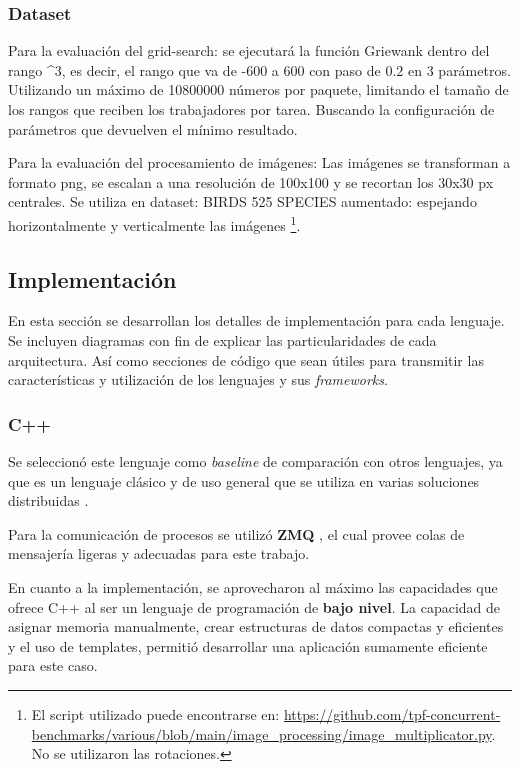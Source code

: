 \documentclass[11pt]{article}
\let\Oldsubsection\subsection
\renewcommand{\subsection}{\FloatBarrier\Oldsubsection}
\let\Oldsubsubsection\subsubsection
\renewcommand{\subsubsection}{\FloatBarrier\Oldsubsubsection}
\begin{document}
\subsubsection{Dataset}

Para la evaluación del grid-search: se ejecutará la función Griewank \cite{sis_dist:griewank} dentro del rango \break
[-600; 600; $0.2$]\^{}3, es decir, el rango que va de -600 a 600 con paso de $0.2$ en 3 parámetros. Utilizando un máximo de 10800000 números por paquete, limitando el tamaño de los rangos que reciben los trabajadores por tarea. Buscando la configuración de parámetros que devuelven el mínimo resultado.

Para la evaluación del procesamiento de imágenes: Las imágenes se transforman a formato png, se escalan a una resolución de 100x100 y se recortan los 30x30 px centrales. Se utiliza en dataset: BIRDS 525 SPECIES \cite{sis_dist:birds_dataset} aumentado: espejando horizontalmente y verticalmente las imágenes \footnote{El script utilizado puede encontrarse en: \url{https://github.com/tpf-concurrent-benchmarks/various/blob/main/image_processing/image_multiplicator.py}. No se utilizaron las rotaciones.}.

\subsection{Implementación}

En esta sección se desarrollan los detalles de implementación para cada lenguaje. Se incluyen diagramas con fin de explicar las particularidades de cada arquitectura. Así como secciones de código que sean útiles para transmitir las características y utilización de los lenguajes y sus \textit{frameworks}.

\subsubsection{C++}

Se seleccionó este lenguaje como \textit{baseline} de comparación con otros lenguajes, ya que es un lenguaje clásico y de uso general que se utiliza en varias soluciones distribuidas \cite{cpp:ex:ray-io} \cite{cpp:ex:red-panda}.

Para la comunicación de procesos se utilizó \textbf{ZMQ} \cite{cpp:lib:zmq}, el cual provee colas de mensajería ligeras y adecuadas para este trabajo.

En cuanto a la implementación, se aprovecharon al máximo las capacidades que ofrece C++ al ser un lenguaje de programación de \textbf{bajo nivel}. La capacidad de asignar memoria manualmente, crear estructuras de datos compactas y eficientes y el uso de  templates, permitió desarrollar una aplicación sumamente eficiente para este caso.
\end{document}
